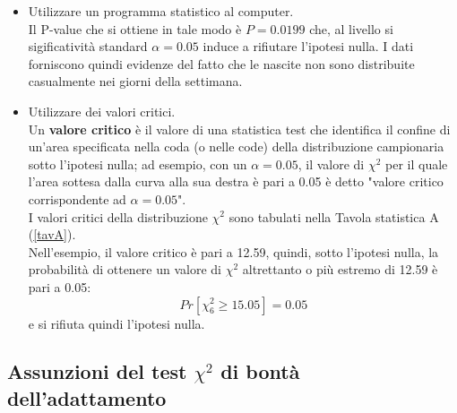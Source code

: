 \documentclass[10pt, draft]{book}
\newcommand{\tightlist}{%
\setlength{\itemsep}{1pt}\setlength{\parskip}{0pt}\setlength{\parsep}{0pt}}
\begin{document}
\begin{itemize} \tightlist
    \item Utilizzare un programma statistico al computer.
    \\
    Il P-value che si ottiene in tale modo è $P = 0.0199$ che, al livello si sigificatività standard $\alpha = 0.05$ induce a rifiutare l'ipotesi nulla. I dati forniscono quindi evidenze del fatto che le nascite non sono distribuite casualmente nei giorni della settimana.
    \item Utilizzare dei valori critici.
    \\
    Un \textbf{valore critico} è il valore di una statistica test che identifica il confine di un'area specificata nella coda (o nelle code) della distribuzione campionaria sotto l'ipotesi nulla; ad esempio, con un $\alpha = 0.05$, il valore di $\chi^2$ per il quale l'area sottesa dalla curva alla sua destra è pari a 0.05 è detto "valore critico corrispondente ad $\alpha = 0.05$".
    \\
    I valori critici della distribuzione $\chi^2$ sono tabulati nella Tavola statistica A (\ref{tavA}).
    \\
    Nell'esempio, il valore critico è pari a 12.59, quindi, sotto l'ipotesi nulla, la probabilità di ottenere un valore di $\chi^2$ altrettanto o più estremo di 12.59 è pari a 0.05:
    \begin{equation}
    Pr[\chi^2_6 \ge 15.05] = 0.05
    \end{equation}
    e si rifiuta quindi l'ipotesi nulla.
\end{itemize}

\subsection{Assunzioni del test \texorpdfstring{$\chi^2$}{Lg} di bontà dell'adattamento}
\end{document}
